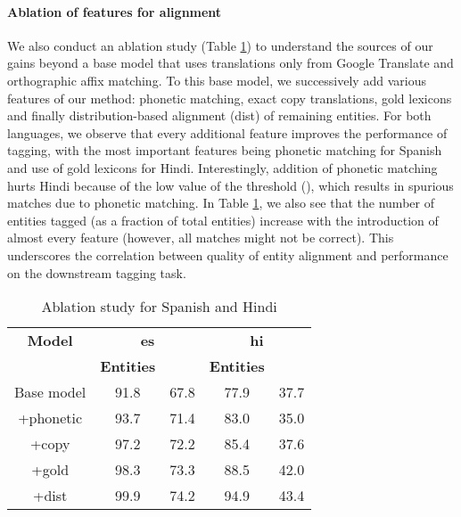 \documentclass[11pt,a4paper]{article}
\begin{document}
\paragraph{Ablation of features for alignment}
We also conduct an ablation study (Table \ref{tab:ablation}) 
to understand the sources of our gains beyond a base model 
that uses translations only from Google Translate and orthographic affix matching. 
To this base model, we successively add various features of our method: 
phonetic matching, exact copy translations, gold lexicons
and finally distribution-based alignment (dist) of remaining entities. 
For both languages, we observe that every additional feature 
improves the performance of tagging, with the most important features 
being phonetic matching for Spanish and use of gold lexicons for Hindi. 
Interestingly, addition of phonetic matching hurts Hindi because of the low value of the threshold (), which results in spurious matches due to phonetic matching. 
In Table \ref{tab:ablation}, we also see that the number of entities tagged
(as a fraction of total entities) increase with the introduction of almost every feature 
(however, all matches might not be correct). 
This underscores the correlation between quality of entity alignment 
and performance on the downstream tagging task. 


\begin{table}[htb]
\small
\centering
\begin{tabularx}{220pt}{ccccc}
\toprule
\bf Model & \multicolumn{2}{c}{\bf es} & \multicolumn{2}{c}{\bf hi} \\
 & \bf  Entities & \bf   & \bf  Entities & \bf  \\
\midrule
Base model & 91.8 & 67.8 & 77.9 & 37.7 \\
\hspace{8pt}+phonetic & 93.7 & 71.4 & 83.0 & 35.0 \\
\hspace{8pt}+copy & 97.2 & 72.2 & 85.4 & 37.6 \\
\hspace{8pt}+gold & 98.3 & 73.3 & 88.5 & 42.0 \\
\hspace{8pt}+dist & 99.9 & 74.2 & 94.9 & 43.4 \\
\bottomrule
\end{tabularx}
\caption{Ablation study for Spanish and Hindi}
\label{tab:ablation}
\end{table}
\end{document}
